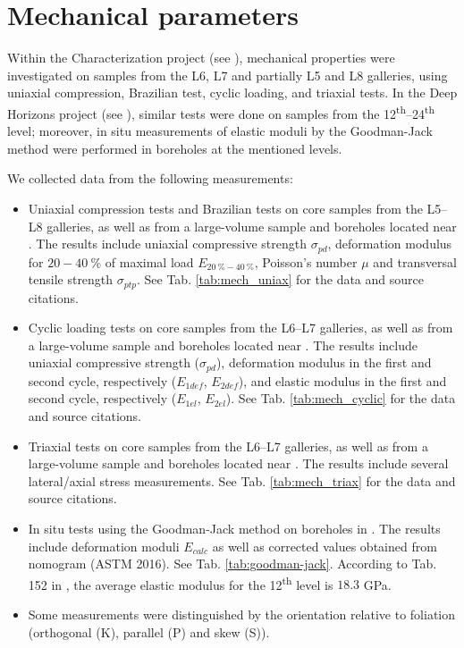 \section{Mechanical parameters}\label{sec:review_mech}


Within the Characterization project (see \cite{tz_char_1,tz_char_2,tz_char_3}), mechanical properties were investigated on samples from the L6, L7 and partially L5 and L8 galleries, using uniaxial compression, Brazilian test, cyclic loading, and triaxial tests.
In the Deep Horizons project (see \cite{tz_hh}), similar tests were done on samples from the 12\textsuperscript{th}--24\textsuperscript{th} level; moreover, in situ measurements of elastic moduli by the Goodman-Jack method were performed in boreholes at the mentioned levels.

We collected data from the following measurements:
\begin{itemize}
    \item Uniaxial compression tests and Brazilian tests on core samples from the L5--L8 galleries, as well as from a large-volume sample and boreholes located near \URFBII. The results include uniaxial compressive strength $\sigma_{pd}$, deformation modulus for $20-40~\%$ of maximal load $E_{20~\%-40~\%}$, Poisson's number $\mu$ and transversal tensile strength $\sigma_{ptp}$. See Tab. \ref{tab:mech_uniax} for the data and source citations.

    \item Cyclic loading tests on core samples from the L6--L7 galleries, as well as from a large-volume sample and boreholes located near \URFBII. The results include uniaxial compressive strength ($\sigma_{pd}$), deformation modulus in the first and second cycle, respectively ($E_{1def}$, $E_{2def}$), and elastic modulus in the first and second cycle, respectively ($E_{1el}$, $E_{2el}$). See Tab. \ref{tab:mech_cyclic} for the data and source citations.

    \item Triaxial tests on core samples from the L6--L7 galleries, as well as from a large-volume sample and boreholes located near \URFBII. The results include several lateral/axial stress measurements. See Tab. \ref{tab:mech_triax} for the data and source citations.

    \item In situ tests using the Goodman-Jack method on boreholes in \URFBII. The results include deformation moduli $E_{calc}$ as well as corrected values obtained from nomogram (ASTM 2016). See Tab. \ref{tab:goodman-jack}. According to Tab. 152 in \cite{tz_hh}, the average elastic modulus for the 12\textsuperscript{th} level is $18.3$ \unit\GPa.

    \item Some measurements were distinguished by the orientation relative to foliation (orthogonal (K), parallel (P) and skew (S)).
\end{itemize}



